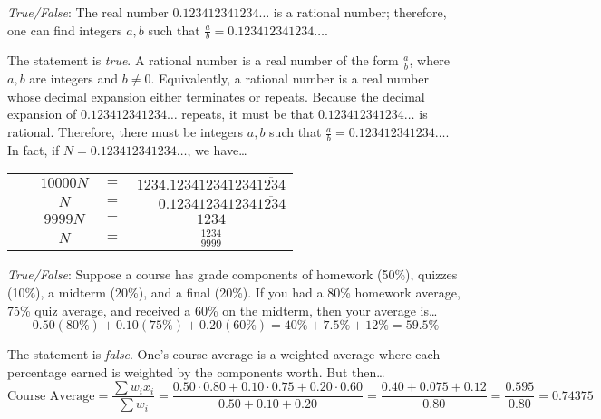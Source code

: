 \documentclass[11pt,letterpaper]{article}
\begin{document}
\newpage



\quizsol \textit{True/False}: The real number $0.123412341234\ldots$ is a rational number; therefore, one can find integers $a, b$ such that $\frac{a}{b}= 0.123412341234\ldots$. \pspace

\sol The statement is \textit{true}. A rational number is a real number of the form $\frac{a}{b}$, where $a, b$ are integers and $b \neq 0$. Equivalently, a rational number is a real number whose decimal expansion either terminates or repeats. Because the decimal expansion of $0.123412341234\ldots$ repeats, it must be that $0.123412341234\ldots$ is rational. Therefore, there must be integers $a, b$ such that $\frac{a}{b}= 0.123412341234\dots$. In fact, if $N= 0.123412341234\dots$, we have\ldots
	\begin{table}[!ht]
	\centering\small
	\begin{tabular}{rccc}
	& $10000N$ & $=$ & $1234.123412341234\overline{1234}$ \\ 
	$-$ & $N$ & $=$ & $\phantom{123}0.123412341234\overline{1234}$ \\ \hline
	& $9999N$ & $=$ & $1234$ \\[0.1cm]
	& $N$ & $=$ & $\frac{1234}{9999}$
	\end{tabular}
	\end{table} \pvspace{1.3cm}



\quizsol \textit{True/False}: Suppose a course has grade components of homework (50\%), quizzes (10\%), a midterm (20\%), and a final (20\%). If you had a 80\% homework average, 75\% quiz average, and received a 60\% on the midterm, then your average is\dots
	\[
	0.50(80\%) + 0.10(75\%) + 0.20(60\%)= 40\% + 7.5\% + 12\%= 59.5\%
	\] \pspace

\sol The statement is \textit{false}. One's course average is a weighted average where each percentage earned is weighted by the components worth. But then\dots
	\[
	\text{Course Average}= \dfrac{\sum w_i x_i}{\sum w_i}= \dfrac{0.50 \cdot 0.80 + 0.10 \cdot 0.75 + 0.20 \cdot 0.60}{0.50 + 0.10 + 0.20}= \dfrac{0.40 + 0.075 + 0.12}{0.80}= \dfrac{0.595}{0.80}= 0.74375
	\] \pvspace{1.3cm}


\end{document}
